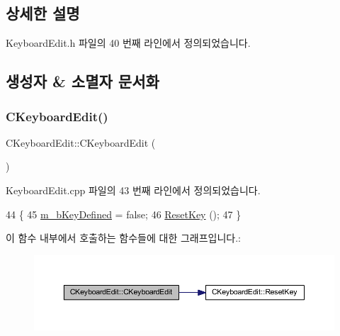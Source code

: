 \subsection{상세한 설명}


Keyboard\+Edit.\+h 파일의 40 번째 라인에서 정의되었습니다.



\subsection{생성자 \& 소멸자 문서화}
\mbox{\label{class_c_keyboard_edit_a1a1165204f7f3bbfbd997c8cc94c97f8}} 
\subsubsection{\texorpdfstring{C\+Keyboard\+Edit()}{CKeyboardEdit()}}
{\footnotesize\ttfamily C\+Keyboard\+Edit\+::\+C\+Keyboard\+Edit (\begin{DoxyParamCaption}{ }\end{DoxyParamCaption})}



Keyboard\+Edit.\+cpp 파일의 43 번째 라인에서 정의되었습니다.


\begin{DoxyCode}
44 \{
45   \mbox{\hyperlink{class_c_keyboard_edit_a9bf24703c8d1a3a019b43dc67c26c3a0}{m\_bKeyDefined}} = \textcolor{keyword}{false};
46   \mbox{\hyperlink{class_c_keyboard_edit_ad0185cc0cad77250cc32ef1d9ffb8593}{ResetKey}} ();
47 \}
\end{DoxyCode}
이 함수 내부에서 호출하는 함수들에 대한 그래프입니다.\+:
\nopagebreak
\begin{figure}[H]
\begin{center}
\leavevmode
\includegraphics[width=350pt]{class_c_keyboard_edit_a1a1165204f7f3bbfbd997c8cc94c97f8_cgraph}
\end{center}
\end{figure}
\mbox{\label{class_c_keyboard_edit_aeddf780fee33d17188b5641cd384ab92}} 
